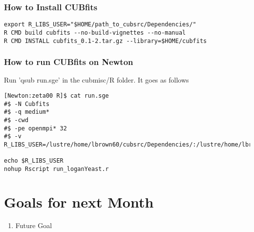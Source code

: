 \subsubsection{How to Install CUBfits}

\begin{verbatim}
export R_LIBS_USER="$HOME/path_to_cubsrc/Dependencies/"
R CMD build cubfits --no-build-vignettes --no-manual
R CMD INSTALL cubfits_0.1-2.tar.gz --library=$HOME/cubfits
\end{verbatim}

\subsubsection{How to run CUBfits on Newton}

Run 'qsub run.sge' in the cubmisc/R folder. It goes as follows 
\begin{verbatim}
[Newton:zeta00 R]$ cat run.sge
#$ -N Cubfits
#$ -q medium*
#$ -cwd
#$ -pe openmpi* 32
#$ -v R_LIBS_USER=/lustre/home/lbrown60/cubsrc/Dependencies/:/lustre/home/lbrown60/cubfits

echo $R_LIBS_USER
nohup Rscript run_loganYeast.r
\end{verbatim}

\section{Goals for next Month}
\begin{enumerate}
\item Future Goal
\end{enumerate}


